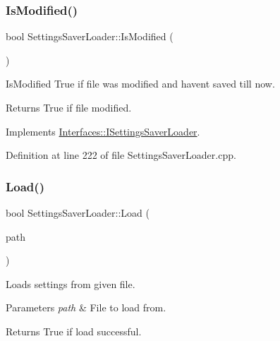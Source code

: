 \subsubsection{\texorpdfstring{Is\+Modified()}{IsModified()}}
{\footnotesize\ttfamily bool Settings\+Saver\+Loader\+::\+Is\+Modified (\begin{DoxyParamCaption}{ }\end{DoxyParamCaption})\hspace{0.3cm}{\ttfamily [virtual]}}



Is\+Modified True if file was modified and haven\textquotesingle{}t saved till now. 

\begin{DoxyReturn}{Returns}
True if file modified. 
\end{DoxyReturn}


Implements \hyperlink{class_interfaces_1_1_i_settings_saver_loader_a4c3f69d0bc7c355030c8d371367108d3}{Interfaces\+::\+I\+Settings\+Saver\+Loader}.



Definition at line 222 of file Settings\+Saver\+Loader.\+cpp.

\mbox{\label{class_settings_saver_loader_aaf225d7d568ce33f6350d886bb40312a}} 
\subsubsection{\texorpdfstring{Load()}{Load()}}
{\footnotesize\ttfamily bool Settings\+Saver\+Loader\+::\+Load (\begin{DoxyParamCaption}\item[{Q\+String}]{path }\end{DoxyParamCaption})\hspace{0.3cm}{\ttfamily [virtual]}}



Loads settings from given file. 


\begin{DoxyParams}{Parameters}
{\em path} & File to load from. \\
\hline
\end{DoxyParams}
\begin{DoxyReturn}{Returns}
True if load successful. 
\end{DoxyReturn}


